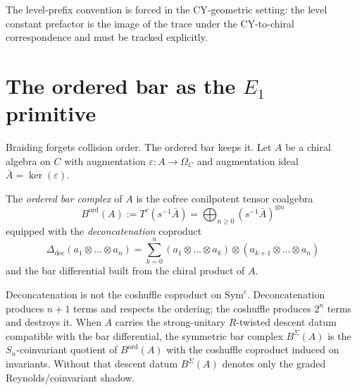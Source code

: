 The level-prefix convention is forced in the CY-geometric setting: the level constant prefactor is the image of the trace under the CY-to-chiral correspondence and must be tracked explicitly.

\section{The ordered bar as the \texorpdfstring{$E_1$}{E-1} primitive}
\label{sec:ordered-bar-primitive}

Braiding forgets collision order. The ordered bar keeps it. Let $A$ be a chiral algebra on $C$ with augmentation $\varepsilon \colon A \to \Omega_C$ and augmentation ideal $\bar A = \ker(\varepsilon)$.

\begin{definition}
\label{def:ordered-bar}
The \emph{ordered bar complex} of $A$ is the cofree conilpotent tensor coalgebra
\[
 B^{\mathrm{ord}}(A) := T^c(s^{-1} \bar A) = \bigoplus_{n \geq 0} (s^{-1}\bar A)^{\otimes n}
\]
equipped with the \emph{deconcatenation} coproduct
\[
 \Delta_{\mathrm{dec}}(a_1 \otimes \dots \otimes a_n) = \sum_{k=0}^{n} (a_1 \otimes \dots \otimes a_k) \otimes (a_{k+1} \otimes \dots \otimes a_n)
\]
and the bar differential built from the chiral product of $A$.
\end{definition}

Deconcatenation is not the coshuffle coproduct on $\mathrm{Sym}^c$.
Deconcatenation produces $n+1$ terms and respects the ordering; the
coshuffle produces $2^n$ terms and destroys it. When $A$ carries the
strong-unitary $R$-twisted descent datum compatible with the bar
differential, the symmetric bar complex $B^{\Sigma}(A)$ is the
$S_n$-coinvariant quotient of $B^{\mathrm{ord}}(A)$ with the coshuffle
coproduct induced on invariants. Without that descent datum
$B^{\Sigma}(A)$ denotes only the graded Reynolds/coinvariant shadow.

